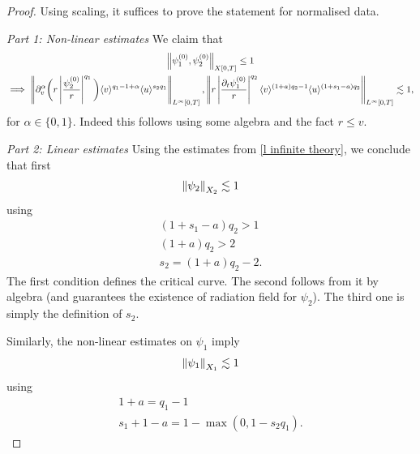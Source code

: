 \documentclass[11pt, oneside]{amsart}
\begin{document}
	\begin{proof}
		Using scaling, it suffices to prove the statement for normalised data.
		
		\textit{Part 1: Non-linear estimates}
		We claim that
		\begin{equation*}
			\begin{gathered}
				\left\lVert \psi^{(0)}_1,\psi^{(0)}_2\right\rVert_{X[0,T]}\leq1\\
				\implies\left\lVert \partial_v^\alpha\bigg(r\left\lvert \frac{\psi^{(0)}_2}{r}\right\rvert^{q_1}\bigg)\langle v \rangle^{q_1-1+\alpha}\langle u \rangle^{s_2q_1}\right\rVert_{L^\infty[0,T]},\left\lVert r\left\lvert \frac{\partial_t\psi^{(0)}_1}{r}\right\rvert^{q_2}\langle v \rangle^{(1+a)q_2-1}\langle u \rangle^{(1+s_1-a)q_2}\right\rVert_{L^\infty[0,T]}\lesssim1,
			\end{gathered}
		\end{equation*}
		for $\alpha\in\{0,1\}$. Indeed this follows using some algebra and the fact $r\leq v$.
		
		\textit{Part 2: Linear estimates}
		Using the estimates from \cref{l infinite theory}, we conclude that first
		\begin{equation*}
			\begin{gathered}
				\left\lVert \psi_2\right\rVert_{X_2}\lesssim1
			\end{gathered}
		\end{equation*}
		using 
		\begin{equation*}
			\begin{gathered}
				(1+s_1-a)q_2>1\\
				(1+a)q_2>2\\
				s_2=(1+a)q_2-2.
			\end{gathered}
		\end{equation*}
		The first condition defines the critical curve. The second follows from it by algebra (and guarantees the existence of radiation field for $\psi_2$). The third one is simply the definition of $s_2$.
		
		Similarly, the non-linear estimates on $\psi_1$ imply
		\begin{equation*}
			\begin{gathered}
				\left\lVert \psi_1\right\rVert_{X_1}\lesssim1
			\end{gathered}
		\end{equation*}
	using
	\begin{equation*}
		\begin{gathered}
			1+a=q_1-1\\
			s_1+1-a=1-\max(0,1-s_2q_1).
		\end{gathered}
	\end{equation*}

	\end{proof}
	
\end{document}
